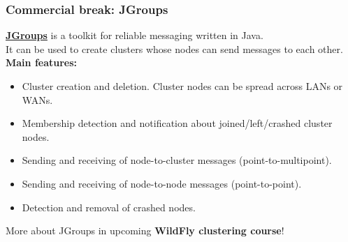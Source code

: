 \documentclass[10pt,utf8]{beamer}
\begin{document}
\begin{frame}
	\frametitle{Commercial break: JGroups}
	\href{http://jgroups.org/}{\color{blue}\textbf{JGroups}} is a toolkit for reliable messaging written in Java. \\
	It can be used to create clusters whose nodes can send messages to each other.\\
	\vspace{0.5cm}
	\textbf{Main features:}
	\begin{itemize}
		\pause
		\item Cluster creation and deletion. Cluster nodes can be spread across LANs or WANs.
		\item Membership detection and notification about joined/left/crashed cluster nodes.
		\item Sending and receiving of node-to-cluster messages (point-to-multipoint).
		\item Sending and receiving of node-to-node messages (point-to-point).
		\item Detection and removal of crashed nodes.
	\end{itemize}
	More about JGroups in upcoming \textbf{WildFly clustering course}!
\end{frame}
\end{document}
